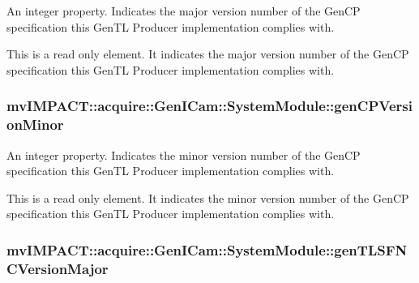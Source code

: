 An integer property. Indicates the major version number of the Gen\+C\+P specification this Gen\+T\+L Producer implementation complies with. 

This is a read only element. It indicates the major version number of the Gen\+C\+P specification this Gen\+T\+L Producer implementation complies with. \hypertarget{classmv_i_m_p_a_c_t_1_1acquire_1_1_gen_i_cam_1_1_system_module_ae40cc61bb868b23e61acd184e1a5b5b9}{
\subsubsection[{gen\+C\+P\+Version\+Minor}]{ mv\+I\+M\+P\+A\+C\+T\+::acquire\+::\+Gen\+I\+Cam\+::\+System\+Module\+::gen\+C\+P\+Version\+Minor}}\label{classmv_i_m_p_a_c_t_1_1acquire_1_1_gen_i_cam_1_1_system_module_ae40cc61bb868b23e61acd184e1a5b5b9}


An integer property. Indicates the minor version number of the Gen\+C\+P specification this Gen\+T\+L Producer implementation complies with. 

This is a read only element. It indicates the minor version number of the Gen\+C\+P specification this Gen\+T\+L Producer implementation complies with. \hypertarget{classmv_i_m_p_a_c_t_1_1acquire_1_1_gen_i_cam_1_1_system_module_a310d740a20bad8729d066423d5445df0}{
\subsubsection[{gen\+T\+L\+S\+F\+N\+C\+Version\+Major}]{ mv\+I\+M\+P\+A\+C\+T\+::acquire\+::\+Gen\+I\+Cam\+::\+System\+Module\+::gen\+T\+L\+S\+F\+N\+C\+Version\+Major}}\label{classmv_i_m_p_a_c_t_1_1acquire_1_1_gen_i_cam_1_1_system_module_a310d740a20bad8729d066423d5445df0}


